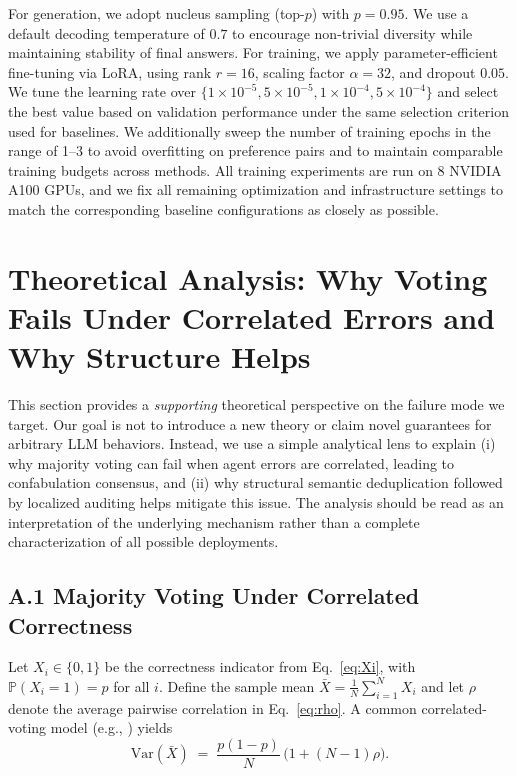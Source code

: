 \documentclass{article}
\theoremstyle{plain}
\theoremstyle{definition}
\theoremstyle{remark}
\begin{document}
For generation, we adopt nucleus sampling (top-$p$) with $p=0.95$. We use a default decoding temperature of $0.7$ to encourage non-trivial diversity while maintaining stability of final answers.
For training, we apply parameter-efficient fine-tuning via LoRA, using rank $r=16$, scaling factor $\alpha=32$, and dropout $0.05$.
We tune the learning rate over $\{1\times 10^{-5}, 5\times 10^{-5}, 1\times 10^{-4}, 5\times 10^{-4}\}$ and select the best value
based on validation performance under the same selection criterion used for baselines.
We additionally sweep the number of training epochs in the range of 1--3 to avoid overfitting on preference pairs and to maintain
comparable training budgets across methods.
All training experiments are run on 8 NVIDIA A100 GPUs, and we fix all remaining optimization and infrastructure settings to match the corresponding baseline configurations as closely as possible.



\section{Theoretical Analysis: Why Voting Fails Under Correlated Errors and Why Structure Helps}
\label{app:toy_analysis}

This section provides a \emph{supporting} theoretical perspective on the failure mode we target.
Our goal is not to introduce a new theory or claim novel guarantees for arbitrary LLM behaviors.
Instead, we use a simple analytical lens to explain (i) why majority voting can fail when agent errors are correlated, leading to
confabulation consensus, and (ii) why structural semantic deduplication followed by localized auditing helps mitigate this issue.
The analysis should be read as an interpretation of the underlying mechanism rather than a complete characterization of all possible deployments.

\subsection{A.1 Majority Voting Under Correlated Correctness}

Let $X_i\in\{0,1\}$ be the correctness indicator from Eq.~\eqref{eq:Xi}, with $\mathbb{P}(X_i=1)=p$ for all $i$.
Define the sample mean $\bar{X}=\frac{1}{N}\sum_{i=1}^N X_i$ and let $\rho$ denote the average pairwise correlation in Eq.~\eqref{eq:rho}.
A common correlated-voting model (e.g., \citealp{austen1996information}) yields
\begin{equation}
\label{eq:var_barX}
\mathrm{Var}(\bar{X})
\;=\;
\frac{p(1-p)}{N}\,\Big(1+(N-1)\rho\Big).
\end{equation}
\end{document}

